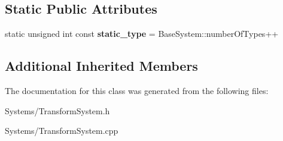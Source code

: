 \subsection*{Static Public Attributes}
\begin{DoxyCompactItemize}
\item 
\mbox{\label{classTransformSystem_adad3188481557394985582ef18693b4d}} 
static unsigned int const {\bfseries static\+\_\+type} = Base\+System\+::number\+Of\+Types++
\end{DoxyCompactItemize}
\subsection*{Additional Inherited Members}


The documentation for this class was generated from the following files\+:\begin{DoxyCompactItemize}
\item 
Systems/Transform\+System.\+h\item 
Systems/Transform\+System.\+cpp\end{DoxyCompactItemize}
